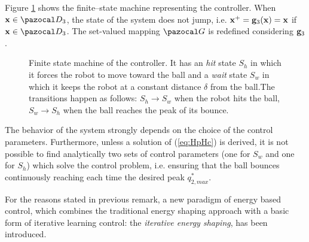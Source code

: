 Figure \ref{fig:ctrl} shows the finite--state machine representing the controller.
When $\xb\in\D_3$, the state of the system does not jump, i.e. $\mathbf{x}^+ = \mathbf{g}_3(\mathbf{x})= \mathbf{x}$ if $\xb\in\D_3$.
The set-valued mapping $\G$ is redefined considering $\mathbf{g}_3$.
%
\begin{figure}[!ht]
	\centering
	\caption[Finite state machine of the controller]{Finite state machine of the controller. It has an \textit{hit} state $S_h$ in which it forces the robot to move toward the ball and a \textit{wait} state $S_w$ in which it keeps the robot at a constant distance $\delta$ from the ball.The transitions happen as follows: $S_h\rightarrow S_w$ when the robot hits the ball, $S_w\rightarrow S_h$ when the ball reaches the peak of its bounce.}
	\label{fig:ctrl}
\end{figure}
%
\begin{rem}
    The behavior of the system strongly depends on the choice of the control parameters. Furthermore, unless a solution of (\ref{eq:HpHc}) is derived, it is not possible to find analytically two sets of control parameters (one for $S_{w}$ and one for $S_{h}$) which solve the control problem, i.e. ensuring that the ball bounces continuously reaching each time the desired peak $q_{2,max}^*$.
\end{rem}
 For the reasons stated in previous remark, a new paradigm of energy based control, which combines the traditional energy shaping approach with a basic form of {iterative learning control}: the \textit{iterative energy shaping}, has been introduced.
